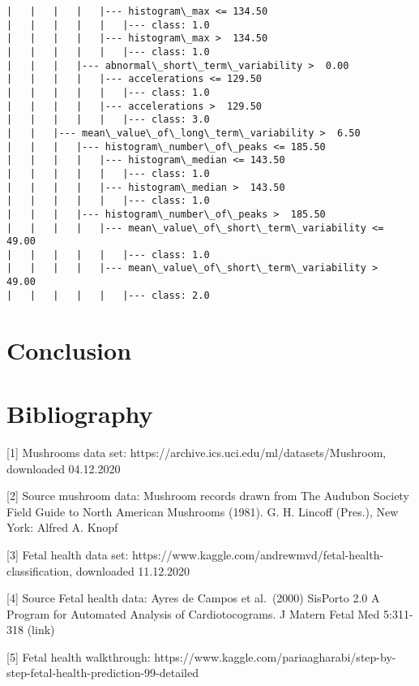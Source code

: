 \documentclass[11pt]{article}
\begin{document}
\begin{Verbatim}[commandchars=\\\{\}]
|   |   |   |   |--- histogram\_max <= 134.50
|   |   |   |   |   |--- class: 1.0
|   |   |   |   |--- histogram\_max >  134.50
|   |   |   |   |   |--- class: 1.0
|   |   |   |--- abnormal\_short\_term\_variability >  0.00
|   |   |   |   |--- accelerations <= 129.50
|   |   |   |   |   |--- class: 1.0
|   |   |   |   |--- accelerations >  129.50
|   |   |   |   |   |--- class: 3.0
|   |   |--- mean\_value\_of\_long\_term\_variability >  6.50
|   |   |   |--- histogram\_number\_of\_peaks <= 185.50
|   |   |   |   |--- histogram\_median <= 143.50
|   |   |   |   |   |--- class: 1.0
|   |   |   |   |--- histogram\_median >  143.50
|   |   |   |   |   |--- class: 1.0
|   |   |   |--- histogram\_number\_of\_peaks >  185.50
|   |   |   |   |--- mean\_value\_of\_short\_term\_variability <= 49.00
|   |   |   |   |   |--- class: 1.0
|   |   |   |   |--- mean\_value\_of\_short\_term\_variability >  49.00
|   |   |   |   |   |--- class: 2.0

    \end{Verbatim}

   
    

    

    \hypertarget{conclusion}{%
\section{Conclusion}\label{conclusion}}

    

    \hypertarget{bibliography}{%
\section{Bibliography}\label{bibliography}}

{[}1{]} Mushrooms data set:
https://archive.ics.uci.edu/ml/datasets/Mushroom, downloaded 04.12.2020

{[}2{]} Source mushroom data: Mushroom records drawn from The Audubon
Society Field Guide to North American Mushrooms (1981). G. H. Lincoff
(Pres.), New York: Alfred A. Knopf

{[}3{]} Fetal health data set:
https://www.kaggle.com/andrewmvd/fetal-health-classification, downloaded
11.12.2020

{[}4{]} Source Fetal health data: Ayres de Campos et al.~(2000) SisPorto
2.0 A Program for Automated Analysis of Cardiotocograms. J Matern Fetal
Med 5:311-318 (link)

{[}5{]} Fetal health walkthrough:
https://www.kaggle.com/pariaagharabi/step-by-step-fetal-health-prediction-99-detailed
\end{document}
